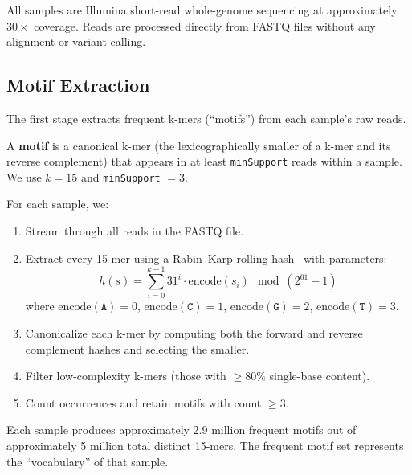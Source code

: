 \documentclass{../yalumba}
\begin{document}
All samples are Illumina short-read whole-genome sequencing at approximately
$30\times$ coverage.  Reads are processed directly from FASTQ files without
any alignment or variant calling.

\subsection{Motif Extraction}

The first stage extracts frequent k-mers (``motifs'') from each sample's raw
reads.

\begin{definition}
A \textbf{motif} is a canonical k-mer (the lexicographically smaller of a k-mer
and its reverse complement) that appears in at least \texttt{minSupport} reads
within a sample.  We use $k = 15$ and \texttt{minSupport} $= 3$.
\end{definition}

\noindent For each sample, we:

\begin{enumerate}
  \item Stream through all reads in the FASTQ file.
  \item Extract every 15-mer using a Rabin--Karp rolling
        hash~\cite{karp1987rabin} with parameters:
        \begin{equation}
          h(s) = \sum_{i=0}^{k-1} 31^i \cdot \text{encode}(s_i)
                 \mod (2^{61} - 1)
          \label{eq:rolling-hash}
        \end{equation}
        where $\text{encode}(\texttt{A}) = 0$, $\text{encode}(\texttt{C}) = 1$,
        $\text{encode}(\texttt{G}) = 2$, $\text{encode}(\texttt{T}) = 3$.
  \item Canonicalize each k-mer by computing both the forward and reverse
        complement hashes and selecting the smaller.
  \item Filter low-complexity k-mers (those with $\geq 80\%$ single-base
        content).
  \item Count occurrences and retain motifs with count $\geq 3$.
\end{enumerate}


Each sample produces approximately 2.9 million frequent motifs out of
approximately 5 million total distinct 15-mers.  The frequent motif set
represents the ``vocabulary'' of that sample.
\end{document}
